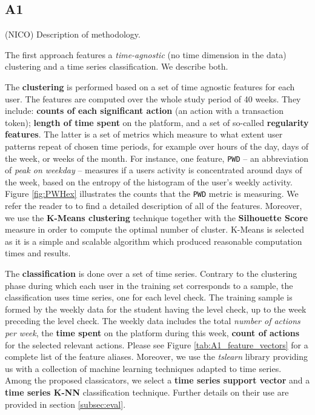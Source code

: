 \documentclass[sigplan,screen]{acmart}
\begin{document}
\subsection{A1}\label{subsec:A1}
{\color{red} (NICO) Description of methodology.}

The first approach features a \textit{time-agnostic} (no time dimension in the data) clustering and a time series classification. We describe both.

The \textbf{clustering} is performed based on a set of time agnostic features for each user. The features are computed over the whole study period of 40 weeks. They include: \textbf{counts of each significant action} (an action with a transaction token); \textbf{length of time spent} on the platform, and a set of so-called \textbf{regularity features}\cite{quantifyreg}. The latter is a set of metrics which measure to what extent user patterns repeat of chosen time periods, for example over hours of the day, days of the week, or weeks of the month. For instance, one feature, \texttt{PWD} -- an abbreviation of \textit{peak on weekday} -- measures if a users activity is concentrated around days of the week, based on the entropy of the histogram of the user's weekly activity. Figure \ref{fig:PWHex} illustrates the counts that the \texttt{PWD} metric is measuring. We refer the reader to \cite{quantifyreg} to find a detailed description of all of the features. Moreover, we use the \textbf{K-Means clustering} technique together with the \textbf{Silhouette Score} measure in order to compute the optimal number of cluster. K-Means is selected as it is a simple and scalable algorithm which produced reasonable computation times and results.

The \textbf{classification} is done over a set of time series. Contrary to the clustering phase during which each user in the training set corresponds to a sample, the classification uses time series, one for each level check. The training sample is formed by the weekly data for the student having the level check, up to the week preceding the level check. The weekly data includes the total \textit{number of actions per week}, the \textbf{time spent} on the platform during this week, \textbf{count of actions} for the selected relevant actions. Please see Figure \ref{tab:A1_feature_vectors} for a complete list of the feature aliases. Moreover, we use the \emph{tslearn}\cite{tslearn} library providing us with a collection of machine learning techniques adapted to time series. Among the proposed classicators, we select a \textbf{time series support vector} and a \textbf{time series K-NN} classification technique. Further details on their use are provided in section \ref{subsec:eval}.
\end{document}
